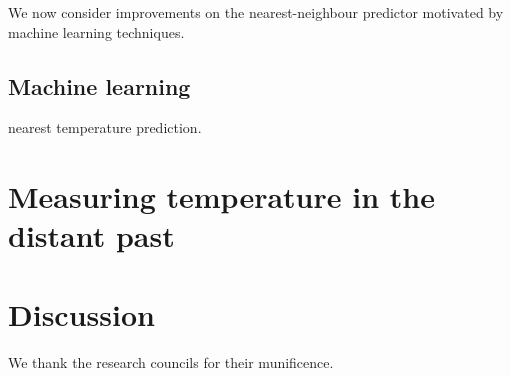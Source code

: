 \documentclass[rmp,aps,twocolumn]{revtex4-1}
\begin{document}
We now consider improvements on the nearest-neighbour predictor motivated by machine learning techniques.  






\subsection{Machine learning}

nearest temperature prediction.  


\section{Measuring temperature in the distant past}

\section{Discussion}\label{sec:discussion}

\begin{acknowledgements}
We thank the research councils for their munificence.

\end{acknowledgements}



\end{document}
